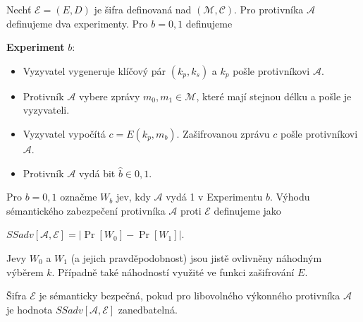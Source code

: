 \documentclass[
  program=infoi,
  biblatex,
  figures=false,
  glossaries,
  index
]{kidiplom}
\begin{document}
        \begin{definition}
            
            Nechť $\mathcal{E} = (E, D)$ je šifra definovaná nad $(\mathcal{M},\mathcal{C})$.
            Pro protivníka $\mathcal{A}$ definujeme dva experimenty. Pro $b = 0, 1$ definujeme

            \medskip

            \textbf{Experiment} $b$:

            \begin{itemize}
                \item
                    Vyzyvatel vygeneruje klíčový pár $(k_p, k_s)$ a $k_p$ pošle protivníkovi $\mathcal{A}$.
                \item 
                    Protivník $\mathcal{A}$ vybere zprávy $m_0, m_1 \in \mathcal{M}$, které mají stejnou délku a pošle je vyzyvateli.
                \item
                    Vyzyvatel vypočítá $c = E(k_p, m_b)$.
                    Zašifrovanou zprávu $c$ pošle protivníkovi $\mathcal{A}$.
                \item
                    Protivník $\mathcal{A}$ vydá bit $\hat{b} \in {0,1}$.
            \end{itemize}

            Pro $b = 0, 1$ označme $W_b$ jev, kdy $\mathcal{A}$ vydá 1 v Experimentu $b$.
            Výhodu sémantického zabezpečení protivníka $\mathcal{A}$ proti $\mathcal{E}$ definujeme jako

            \begin{center}
                $SSadv[\mathcal{A}, \mathcal{E}] = \left\lvert\Pr[W_0] - \Pr[W_1]\right\rvert$.

                
            \end{center}

        \end{definition}

        \begin{remark}
            Jevy $W_0$ a $W_1$ (a jejich pravděpodobnost) jsou jistě ovlivněny náhodným výběrem $k$.
            Případně také náhodností využité ve funkci zašifrování $E$.
        \end{remark}

        \begin{definition}\label{def:semantically-secure-public}
            Šifra $\mathcal{E}$ je sémanticky bezpečná, pokud pro libovolného výkonného protivníka $\mathcal{A}$
            je hodnota $SSadv[\mathcal{A}, \mathcal{E}]$ zanedbatelná.
        \end{definition}
\end{document}
